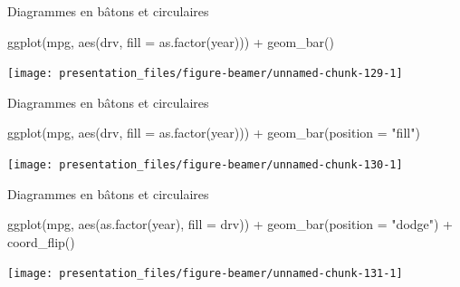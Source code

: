 \documentclass[12pt,ignorenonframetext,handout,]{beamer}
\newenvironment{Shaded}{}{}
\newcommand{\DataTypeTok}[1]{#1}
\newcommand{\KeywordTok}[1]{\textcolor[rgb]{0.00,0.00,1.00}{#1}}
\newcommand{\NormalTok}[1]{#1}
\newcommand{\OperatorTok}[1]{#1}
\newcommand{\StringTok}[1]{\textcolor[rgb]{0.00,0.50,0.50}{#1}}
\renewenvironment{Shaded}{\begin{snugshade}}{\end{snugshade}}
\begin{document}
\begin{frame}[fragile]{Diagrammes en bâtons et circulaires}
\protect\hypertarget{diagrammes-en-batons-et-circulaires-8}{}

\footnotesize \center

\begin{Shaded}
\begin{Highlighting}[]
\KeywordTok{ggplot}\NormalTok{(mpg, }\KeywordTok{aes}\NormalTok{(drv, }\DataTypeTok{fill =} \KeywordTok{as.factor}\NormalTok{(year))) }\OperatorTok{+}\StringTok{ }
\StringTok{  }\KeywordTok{geom_bar}\NormalTok{()}
\end{Highlighting}
\end{Shaded}

\texttt{[image: presentation\_files/figure-beamer/unnamed-chunk-129-1]}

\end{frame}

\begin{frame}[fragile]{Diagrammes en bâtons et circulaires}
\protect\hypertarget{diagrammes-en-batons-et-circulaires-9}{}

\footnotesize \center

\begin{Shaded}
\begin{Highlighting}[]
\KeywordTok{ggplot}\NormalTok{(mpg, }\KeywordTok{aes}\NormalTok{(drv, }\DataTypeTok{fill =} \KeywordTok{as.factor}\NormalTok{(year))) }\OperatorTok{+}\StringTok{ }
\StringTok{  }\KeywordTok{geom_bar}\NormalTok{(}\DataTypeTok{position =} \StringTok{"fill"}\NormalTok{)}
\end{Highlighting}
\end{Shaded}

\texttt{[image: presentation\_files/figure-beamer/unnamed-chunk-130-1]}

\end{frame}

\begin{frame}[fragile]{Diagrammes en bâtons et circulaires}
\protect\hypertarget{diagrammes-en-batons-et-circulaires-10}{}

\footnotesize \center

\begin{Shaded}
\begin{Highlighting}[]
\KeywordTok{ggplot}\NormalTok{(mpg, }\KeywordTok{aes}\NormalTok{(}\KeywordTok{as.factor}\NormalTok{(year), }\DataTypeTok{fill =}\NormalTok{ drv)) }\OperatorTok{+}\StringTok{ }
\StringTok{  }\KeywordTok{geom_bar}\NormalTok{(}\DataTypeTok{position =} \StringTok{"dodge"}\NormalTok{) }\OperatorTok{+}\StringTok{ }
\StringTok{  }\KeywordTok{coord_flip}\NormalTok{()}
\end{Highlighting}
\end{Shaded}

\texttt{[image: presentation\_files/figure-beamer/unnamed-chunk-131-1]}

\end{frame}
\end{document}
